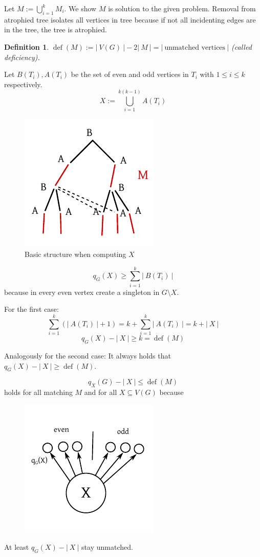 \documentclass{article}
\newtheorem*{definition}{Definition}
\newcommand{\card}[1]{\left|\:\!#1\:\!\right|}
\DeclareMathOperator{\deficiency}{def}
\begin{document}
Let $M := \bigcup_{i=1}^k M_i$. We show $M$ is solution to the given problem.
Removal from atrophied tree isolates all vertices in tree because if not all incidenting edges are in the tree, the tree is atrophied.

\begin{definition}
$\deficiency(M) := \card{V(G)} - 2\card{M} = \card{\text{unmatched vertices}}$ (called \emph{deficiency}).
\end{definition}
Let $B(T_i), A(T_i)$ be the set of even and odd vertices in ${T_i}$ with $1 \leq i \leq k$ respectively.
\[
  X := \bigcup_{i=1}^{k(k-1)} A(T_i)
\]
\begin{figure}[!ht]
  \begin{center}
    \includegraphics{img/perfect_matching_set_X.pdf}
    \caption{Basic structure when computing $X$}
  \end{center}
\end{figure}
\[
  q_G(X) \geq \sum_{i=1}^k \card{B(T_i)}
\]
because in every even vertex create a singleton in $G \setminus X$.

For the first case:
\[
  \sum_{i=1}^k \left(\card{A(T_i)} + 1\right) = k + \sum_{i=1}^k \card{A(T_i)} = k + \card{X}
\] \[
  q_G(X) - \card{X} \geq k = \deficiency(M)
\]

Analogously for the second case:
It always holds that $q_G(X) - \card{X} \geq \deficiency(M)$.

\[
  q_X(G) - \card{X} \leq \deficiency(M)
\]
holds for all matching $M$ and for all $X \subseteq V(G)$ because
\begin{figure}[!ht]
  \begin{center}
    \includegraphics{img/perfect_matching_because.pdf}
  \end{center}
\end{figure}
At least $q_G(X) - \card{X}$ stay unmatched.
\end{document}

